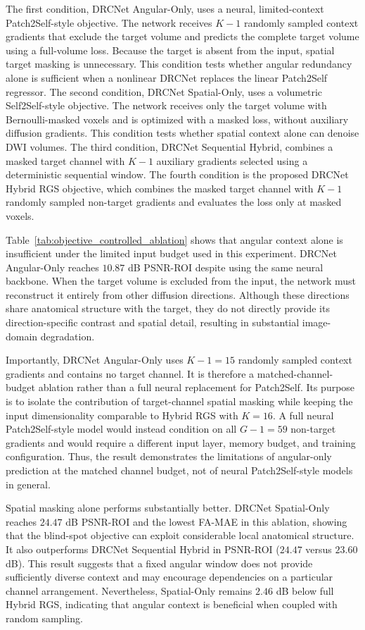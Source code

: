 \documentclass[preprint,12pt]{elsarticle}
\begin{document}
The first condition, DRCNet Angular-Only, uses a neural, limited-context Patch2Self-style objective. The network receives $K-1$ randomly sampled context gradients that exclude the target volume and predicts the complete target volume using a full-volume loss. Because the target is absent from the input, spatial target masking is unnecessary. This condition tests whether angular redundancy alone is sufficient when a nonlinear DRCNet replaces the linear Patch2Self regressor. The second condition, DRCNet Spatial-Only, uses a volumetric Self2Self-style objective. The network receives only the target volume with Bernoulli-masked voxels and is optimized with a masked loss, without auxiliary diffusion gradients. This condition tests whether spatial context alone can denoise DWI volumes. The third condition, DRCNet Sequential Hybrid, combines a masked target channel with $K-1$ auxiliary gradients selected using a deterministic sequential window. The fourth condition is the proposed DRCNet Hybrid RGS objective, which combines the masked target channel with $K-1$ randomly sampled non-target gradients and evaluates the loss only at masked voxels.

Table~\ref{tab:objective_controlled_ablation} shows that angular context alone is insufficient under the limited input budget used in this experiment. DRCNet Angular-Only reaches $10.87$ dB PSNR-ROI despite using the same neural backbone. When the target volume is excluded from the input, the network must reconstruct it entirely from other diffusion directions. Although these directions share anatomical structure with the target, they do not directly provide its direction-specific contrast and spatial detail, resulting in substantial image-domain degradation.

Importantly, DRCNet Angular-Only uses $K-1=15$ randomly sampled context gradients and contains no target channel. It is therefore a matched-channel-budget ablation rather than a full neural replacement for Patch2Self. Its purpose is to isolate the contribution of target-channel spatial masking while keeping the input dimensionality comparable to Hybrid RGS with $K=16$. A full neural Patch2Self-style model would instead condition on all $G-1=59$ non-target gradients and would require a different input layer, memory budget, and training configuration. Thus, the result demonstrates the limitations of angular-only prediction at the matched channel budget, not of neural Patch2Self-style models in general.

Spatial masking alone performs substantially better. DRCNet Spatial-Only reaches $24.47$ dB PSNR-ROI and the lowest FA-MAE in this ablation, showing that the blind-spot objective can exploit considerable local anatomical structure. It also outperforms DRCNet Sequential Hybrid in PSNR-ROI ($24.47$ versus $23.60$ dB). This result suggests that a fixed angular window does not provide sufficiently diverse context and may encourage dependencies on a particular channel arrangement. Nevertheless, Spatial-Only remains $2.46$ dB below full Hybrid RGS, indicating that angular context is beneficial when coupled with random sampling.
\end{document}
